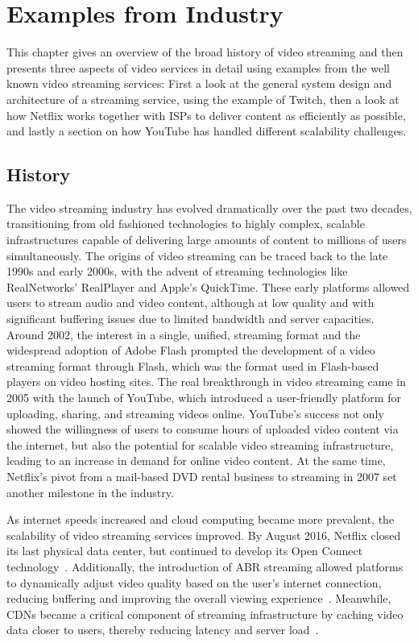 \chapter{Examples from Industry}\label{chapter:examples}

This chapter gives an overview of the broad history of video streaming and then presents three aspects of video services in detail using examples from the well known video streaming services: First a look at the general system design and architecture of a streaming service, using the example of Twitch, then a look at how Netflix works together with \ac{ISPs} to deliver content as efficiently as possible, and lastly a section on how YouTube has handled different scalability challenges.     

\section{History}
The video streaming industry has evolved dramatically over the past two decades, transitioning from old fashioned technologies to highly complex, scalable infrastructures capable of delivering large amounts of content to millions of users simultaneously. The origins of video streaming can be traced back to the late 1990s and early 2000s, with the advent of streaming technologies like RealNetworks' RealPlayer and Apple's QuickTime. These early platforms allowed users to stream audio and video content, although at low quality and with significant buffering issues due to limited bandwidth and server capacities.
Around 2002, the interest in a single, unified, streaming format and the widespread adoption of Adobe Flash prompted the development of a video streaming format through Flash, which was the format used in Flash-based players on video hosting sites.
The real breakthrough in video streaming came in 2005 with the launch of YouTube, which introduced a user-friendly platform for uploading, sharing, and streaming videos online. YouTube's success not only showed the willingness of users to consume hours of uploaded video content via the internet, but also the potential for scalable video streaming infrastructure, leading to an increase in demand for online video content. At the same time, Netflix's pivot from a mail-based DVD rental business to streaming in 2007 set another milestone in the industry. 

As internet speeds increased and cloud computing became more prevalent, the scalability of video streaming services improved. By August 2016, Netflix closed its last physical data center, but continued to develop its Open Connect technology~\parencite{netflix_cloud}.
Additionally, the introduction of \ac{ABR} streaming allowed platforms to dynamically adjust video quality based on the user's internet connection, reducing buffering and improving the overall viewing experience~\parencite{abr}. Meanwhile, \ac{CDN}s became a critical component of streaming infrastructure by caching video data closer to users, thereby reducing latency and server load~\parencite{cdn_basic}.

